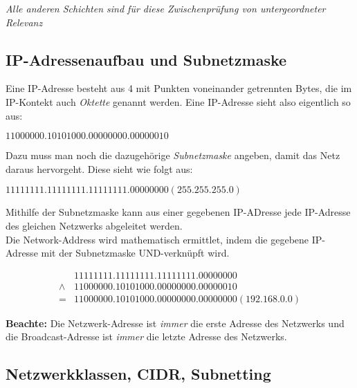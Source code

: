 \documentclass[a4paper, 12pt]{report}
\begin{document}
\emph{Alle anderen Schichten sind für diese Zwischenprüfung von untergeordneter
Relevanz}

\subsection{IP-Adressenaufbau und Subnetzmaske}

Eine IP-Adresse besteht aus 4 mit Punkten voneinander getrennten Bytes, die im 
IP-Kontekt auch \emph{Oktette} genannt werden. Eine IP-Adresse sieht also 
eigentlich so aus: \\

\begin{center}
$11000000.10101000.00000000.00000010$
\end{center}

Dazu muss man noch die dazugehörige \emph{Subnetzmaske} angeben, damit das Netz 
daraus hervorgeht. Diese sieht wie folgt aus: \\

\begin{center}
    $11111111.11111111.11111111.00000000 (255.255.255.0)$
\end{center}

Mithilfe der Subnetzmaske kann aus einer gegebenen IP-ADresse jede IP-Adresse 
des gleichen Netzwerks abgeleitet werden. \\

Die Network-Address wird mathematisch ermittlet, indem die gegebene IP-Adresse
mit der Subnetzmaske UND-verknüpft wird. \\

\begin{center}
    \begin{equation}
        \begin{aligned}
             & 11111111.11111111.11111111.00000000 \\ 
             \land & 11000000.10101000.00000000.00000010 \\
             = & 11000000.10101000.00000000.00000000 (192.168.0.0)
        \end{aligned}
    \end{equation}
\end{center}

\textbf{Beachte:} Die Netzwerk-Adresse ist \emph{immer} die erste Adresse des 
Netzwerks und die Broadcast-Adresse ist \emph{immer} die letzte Adresse des 
Netzwerks. 

\subsection{Netzwerkklassen, CIDR, Subnetting}
\end{document}
